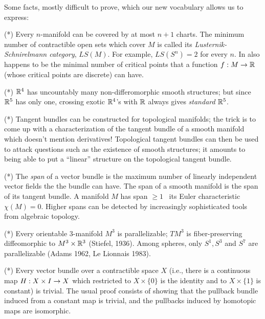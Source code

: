 \bsk

\noindent Some facts, mostly difficult to prove, which our new vocabulary allows us to express:

\msk

\noindent (*) Every $n$-manifold can be covered by at most $n+1$ charts. The minimum number of contractible 
open sets which cover $M$ is
called its {\it Lusternik-Schnirelmann category}, $LS(M)$. For example, $LS(S^n)=2$ for every $n$.
In also happens to be the minimal number of critical points that a function $f:M\rightarrow {\Bbb R}$
(whose critical points are discrete) can have.

\ssk

\noindent (*) ${\Bbb R}^4$ has uncountably many non-differomorphic smooth structures; but since ${\Bbb R}^5$
has only one, crossing exotic ${\Bbb R}^4$'s with ${\Bbb R}$ always gives {\it standard} ${\Bbb R}^5$.

\ssk

\noindent (*) Tangent bundles can be constructed for topological manifolds; the trick is to come up
with a characterization of the tangent bundle of a smooth manifold which doesn't mention
derivatives! Topological tangent bundles can then be used to attack questions such as
the existence of smooth structures; it amounts to being able to put a ``linear'' 
structure on the topological tangent bundle. 

\ssk

\noindent (*) The {\it span} of a vector bundle is the maximum number of linearly independent vector fields
the the bundle can have. The span of a smooth manifold is the span of its tangent bundle.
A manifold $M$ has span $\geq 1$ \lra\ its Euler characteristic $\chi(M)=0$. Higher spans can
be detected by increasingly sophisticated tools from algebraic topology.

\ssk

\noindent (*) Every orientable $3$-manifold $M^3$ is parallelizable; $TM^3$ is fiber-preserving diffeomorphic to
$M^3\times {\Bbb R}^3$ (Stiefel, 1936). Among spheres, only $S^1,S^3$ and $S^7$ are parallelizable
(Adams 1962, Le Lionnais 1983).

\ssk

\noindent (*) Every vector bundle over a contractible space $X$ (i.e., there is a continuous map
$H:X\times I\rightarrow X$ which restricted to $X\times \{0\}$ is the identity and to $X\times\{1\}$ is
constant) is trivial. The usual proof consists of showing that the pullback bundle induced 
from a constant map is trivial, and the pullbacks induced by homotopic maps are isomorphic.

